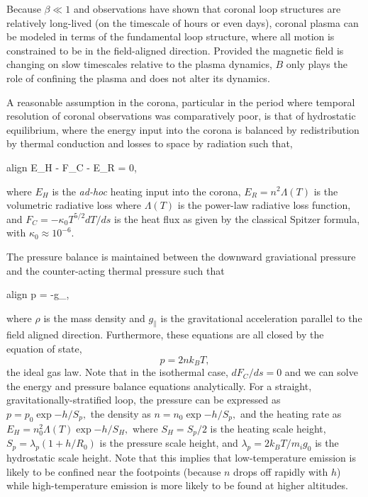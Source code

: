 \begin{enumerate}
\begin{enumerate}
				\par Because $\beta\ll1$ and observations have shown that coronal loop structures are relatively long-lived (on the timescale of hours or even days), coronal plasma can be modeled in terms of the fundamental loop structure, where all motion is constrained to be in the field-aligned direction. Provided the magnetic field is changing on slow timescales relative to the plasma dynamics, $B$ only plays the role of confining the plasma and does not alter its dynamics.
				\par A reasonable assumption in the corona, particular in the period where temporal resolution of coronal observations was comparatively poor, is that of hydrostatic equilibrium, where the energy input into the corona is balanced by redistribution by thermal conduction and losses to space by radiation such that,
				\begin{empheq}[box=\widefbox]{align}
					\label{eq:hydrostatic_energy}
					E_H - F_C - E_R = 0,
				\end{empheq}
				where $E_H$ is the \textit{ad-hoc} heating input into the corona, $E_R=n^2\Lambda(T)$ is the volumetric radiative loss where $\Lambda(T)$ is the power-law radiative loss function, and $F_C=-\kappa_0T^{5/2}dT/ds$ is the heat flux as given by the classical Spitzer formula, with $\kappa_0\approx10^{-6}$. 
				\par The pressure balance is maintained between the downward graviational pressure and the counter-acting thermal pressure such that 
				\begin{empheq}[box=\widefbox]{align}
					p = -\rho g_{\parallel},
				\end{empheq}
				where $\rho$ is the mass density and $g_{\parallel}$ is the gravitational acceleration parallel to the field aligned direction. Furthermore, these equations are all closed by the equation of state,
				\begin{equation}
					p=2nk_BT,
				\end{equation}
				the ideal gas law. Note that in the isothermal case, $dF_C/ds=0$ and we can solve the energy and pressure balance equations analytically. For a straight, gravitationally-stratified loop, the pressure can be expressed as $p=p_0\exp{-h/S_p},$ the density as $n=n_0\exp{-h/S_p},$ and the heating rate as $E_H=n_0^2\Lambda(T)\exp{-h/S_H},$ where $S_H=S_p/2$ is the heating scale height, $S_p=\lambda_p(1+h/R_0)$ is the pressure scale height, and $\lambda_p=2k_BT/m_ig_0$ is the hydrostatic scale height. Note that this implies that low-temperature emission is likely to be confined near the footpoints (because $n$ drops off rapidly with $h$) while high-temperature emission is more likely to be found at higher altitudes. 

\end{enumerate}
\end{enumerate}
